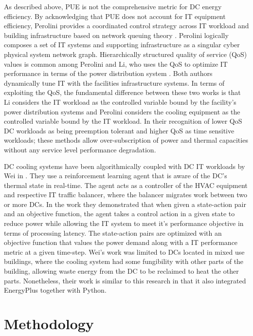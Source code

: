 As described above, PUE is not the comprehensive metric for DC energy efficiency. By acknowledging that PUE does not account for IT equipment efficiency, Perolini provides a coordinated control strategy across IT workload and building infrastructure based on network queuing theory \citep{parolini12}. Perolini logically composes a set of IT systems and supporting infrastructure as a singular cyber physical system network graph. Hierarchically structured quality of service (QoS) values is common among Perolini and Li, who uses the QoS to optimize IT performance in terms of the power distribution system \citep{Li18}. Both authors dynamically tune IT with the facilities infrastructure systems. In terms of exploiting the QoS,  the fundamental difference between these two works is that Li considers the IT workload as the controlled variable bound by the facility's power distribution systems and Perolini considers the cooling equipment as the controlled variable bound by the IT workload. In their recognition of lower QoS DC workloads as being preemption tolerant and higher QoS as time sensitive workloads; these methods allow over-subscription of power and thermal capacities without any service level performance degradation. 

DC cooling systems have been algorithmically coupled with DC IT workloads by Wei in \citep{wei17}. They use a reinforcement learning agent that is aware of the DC's thermal state in real-time. The agent acts as a controller of the HVAC equipment and respective IT traffic balancer, where the balancer migrates work between two or more DCs. In the work they demonstrated that when given a state-action pair and an objective function, the agent takes a control action in a given state to reduce power while allowing the IT system to meet it's performance objective in terms of processing latency. The state-action pairs are optimized with an objective function that values the power demand along with a IT performance metric at a given time-step. Wei's work was limited to DCs located in mixed use buildings, where the cooling system had some fungibility with other parts of the building, allowing waste energy from the DC to be reclaimed to heat the other parts. Nonetheless, their work is similar to this research in that it also integrated EnergyPlus together with Python.

\section{Methodology}

